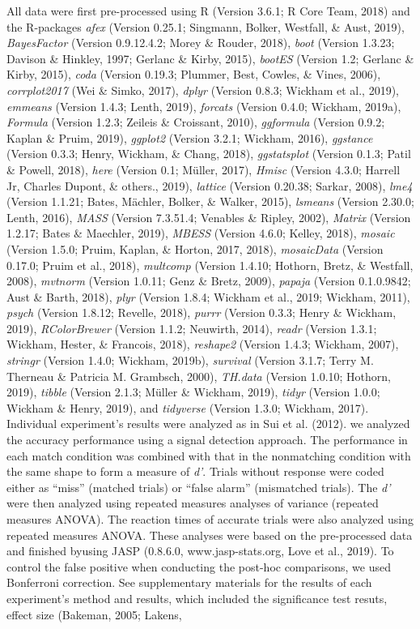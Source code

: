 \documentclass[man]{apa6}
\begin{document}
All data were first pre-processed using R (Version 3.6.1; R Core Team, 2018) and the R-packages \emph{afex} (Version 0.25.1; Singmann, Bolker, Westfall, \& Aust, 2019), \emph{BayesFactor} (Version 0.9.12.4.2; Morey \& Rouder, 2018), \emph{boot} (Version 1.3.23; Davison \& Hinkley, 1997; Gerlanc \& Kirby, 2015), \emph{bootES} (Version 1.2; Gerlanc \& Kirby, 2015), \emph{coda} (Version 0.19.3; Plummer, Best, Cowles, \& Vines, 2006), \emph{corrplot2017} (Wei \& Simko, 2017), \emph{dplyr} (Version 0.8.3; Wickham et al., 2019), \emph{emmeans} (Version 1.4.3; Lenth, 2019), \emph{forcats} (Version 0.4.0; Wickham, 2019a), \emph{Formula} (Version 1.2.3; Zeileis \& Croissant, 2010), \emph{ggformula} (Version 0.9.2; Kaplan \& Pruim, 2019), \emph{ggplot2} (Version 3.2.1; Wickham, 2016), \emph{ggstance} (Version 0.3.3; Henry, Wickham, \& Chang, 2018), \emph{ggstatsplot} (Version 0.1.3; Patil \& Powell, 2018), \emph{here} (Version 0.1; Müller, 2017), \emph{Hmisc} (Version 4.3.0; Harrell Jr, Charles Dupont, \& others., 2019), \emph{lattice} (Version 0.20.38; Sarkar, 2008), \emph{lme4} (Version 1.1.21; Bates, Mächler, Bolker, \& Walker, 2015), \emph{lsmeans} (Version 2.30.0; Lenth, 2016), \emph{MASS} (Version 7.3.51.4; Venables \& Ripley, 2002), \emph{Matrix} (Version 1.2.17; Bates \& Maechler, 2019), \emph{MBESS} (Version 4.6.0; Kelley, 2018), \emph{mosaic} (Version 1.5.0; Pruim, Kaplan, \& Horton, 2017, 2018), \emph{mosaicData} (Version 0.17.0; Pruim et al., 2018), \emph{multcomp} (Version 1.4.10; Hothorn, Bretz, \& Westfall, 2008), \emph{mvtnorm} (Version 1.0.11; Genz \& Bretz, 2009), \emph{papaja} (Version 0.1.0.9842; Aust \& Barth, 2018), \emph{plyr} (Version 1.8.4; Wickham et al., 2019; Wickham, 2011), \emph{psych} (Version 1.8.12; Revelle, 2018), \emph{purrr} (Version 0.3.3; Henry \& Wickham, 2019), \emph{RColorBrewer} (Version 1.1.2; Neuwirth, 2014), \emph{readr} (Version 1.3.1; Wickham, Hester, \& Francois, 2018), \emph{reshape2} (Version 1.4.3; Wickham, 2007), \emph{stringr} (Version 1.4.0; Wickham, 2019b), \emph{survival} (Version 3.1.7; Terry M. Therneau \& Patricia M. Grambsch, 2000), \emph{TH.data} (Version 1.0.10; Hothorn, 2019), \emph{tibble} (Version 2.1.3; Müller \& Wickham, 2019), \emph{tidyr} (Version 1.0.0; Wickham \& Henry, 2019), and \emph{tidyverse} (Version 1.3.0; Wickham, 2017). Individual experiment's results were analyzed as in Sui et al. (2012). we analyzed the accuracy performance using a signal detection approach. The performance in each match condition was combined with that in the nonmatching condition with the same shape to form a measure of \emph{d'}. Trials without response were coded either as \enquote{miss} (matched trials) or \enquote{false alarm} (mismatched trials). The \emph{d'} were then analyzed using repeated measures analyses of variance (repeated measures ANOVA). The reaction times of accurate trials were also analyzed using repeated measures ANOVA. These analyses were based on the pre-processed data and finished byusing JASP (0.8.6.0, www.jasp-stats.org, Love et al., 2019). To control the false positive when conducting the post-hoc comparisons, we used Bonferroni correction. See supplementary materials for the results of each experiment's method and results, which included the significance test resuts, effect size (Bakeman, 2005; Lakens, 
\end{document}
